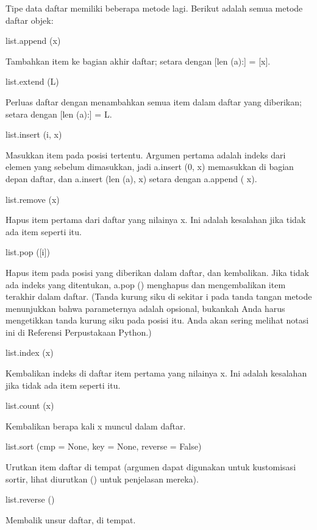 \vspace{12pt}
Tipe data daftar memiliki beberapa metode lagi. Berikut adalah semua metode daftar objek: \par
\vspace{12pt}
\noindent 
list.append (x) \par
\noindent 
Tambahkan item ke bagian akhir daftar; setara dengan [len (a):] = [x]. \par
\vspace{12pt}
\noindent 
list.extend (L) \par
\noindent 
Perluas daftar dengan menambahkan semua item dalam daftar yang diberikan; setara dengan [len (a):] = L. \par
\vspace{12pt}
\noindent 
list.insert (i, x) \par
\noindent 
Masukkan item pada posisi tertentu. Argumen pertama adalah indeks dari elemen yang sebelum dimasukkan, jadi a.insert (0, x) memasukkan di bagian depan daftar, dan a.insert (len (a), x) setara dengan a.append ( x). \par
\vspace{12pt}
\noindent 
list.remove (x) \par
\noindent 
Hapus item pertama dari daftar yang nilainya x. Ini adalah kesalahan jika tidak ada item seperti itu. \par
\vspace{12pt}
\noindent 
list.pop ([i]) \par
\noindent 
Hapus item pada posisi yang diberikan dalam daftar, dan kembalikan. Jika tidak ada indeks yang ditentukan, a.pop () menghapus dan mengembalikan item terakhir dalam daftar. (Tanda kurung siku di sekitar i pada tanda tangan metode menunjukkan bahwa parameternya adalah opsional, bukankah Anda harus mengetikkan tanda kurung siku pada posisi itu. Anda akan sering melihat notasi ini di Referensi Perpustakaan Python.) \par
\vspace{12pt}
\noindent 
list.index (x) \par
\noindent 
Kembalikan indeks di daftar item pertama yang nilainya x. Ini adalah kesalahan jika tidak ada item seperti itu. \par
\vspace{12pt}
\noindent 
list.count (x) \par
\noindent 
Kembalikan berapa kali x muncul dalam daftar. \par
\vspace{12pt}
\noindent 
list.sort (cmp = None, key = None, reverse = False) \par
\noindent 
Urutkan item daftar di tempat (argumen dapat digunakan untuk kustomisasi sortir, lihat diurutkan () untuk penjelasan mereka). \par
\vspace{12pt}
\noindent 
list.reverse () \par
\noindent 
Membalik unsur daftar, di tempat. \par

